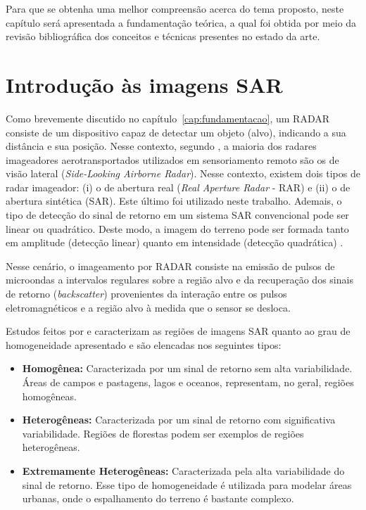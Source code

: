 
Para que se obtenha uma melhor compreensão acerca do tema proposto, neste  capítulo  será  apresentada  a  fundamentação teórica, a qual foi obtida por meio da revisão bibliográfica dos conceitos e técnicas presentes no estado da arte.

\section{Introdução às imagens SAR}

Como brevemente discutido no capítulo~\ref{cap:fundamentacao}, um RADAR consiste de um dispositivo capaz de detectar um objeto (alvo), indicando a sua distância e sua posição. Nesse contexto, segundo \citet{dissert_torres}, a maioria dos radares imageadores aerotransportados utilizados em sensoriamento remoto são os de visão lateral (\textit{Side-Looking Airborne Radar}). Nesse contexto, existem dois tipos de radar imageador: (i) o de abertura real (\textit{Real Aperture Radar} - RAR) e (ii) o de abertura sintética (SAR). Este último foi utilizado neste trabalho. Ademais, o tipo de detecção do sinal de retorno em um sistema SAR convencional pode ser linear ou quadrático. Deste modo, a imagem do terreno pode ser formada tanto em amplitude (detecção linear) quanto em intensidade (detecção quadrática) \citep{dissert_lucca}. 

Nesse cenário, o imageamento por RADAR consiste na emissão de pulsos de microondas a intervalos regulares sobre a região alvo e da recuperação dos sinais de retorno (\textit{backscatter}) provenientes da interação entre os pulsos eletromagnéticos e a região alvo à medida que o sensor se desloca.  

Estudos feitos por \citet{Clutter1997} e \citet{Gao2010StatisticalMO} caracterizam as regiões de imagens SAR quanto ao grau de homogeneidade apresentado e são elencadas nos seguintes tipos:
\begin{itemize}
    \item \textbf{Homogênea:} Caracterizada por um sinal de retorno sem alta variabilidade. Áreas de campos e pastagens, lagos e oceanos, representam, no geral, regiões homogêneas.
    \item \textbf{Heterogêneas:} Caracterizada por um sinal de retorno com significativa variabilidade. Regiões de florestas podem ser exemplos de regiões heterogêneas.
    \item \textbf{Extremamente Heterogêneas:} Caracterizada pela alta variabilidade do sinal de retorno. Esse tipo de homogeneidade é utilizada para modelar áreas urbanas, onde o espalhamento do terreno é bastante complexo.
\end{itemize}


